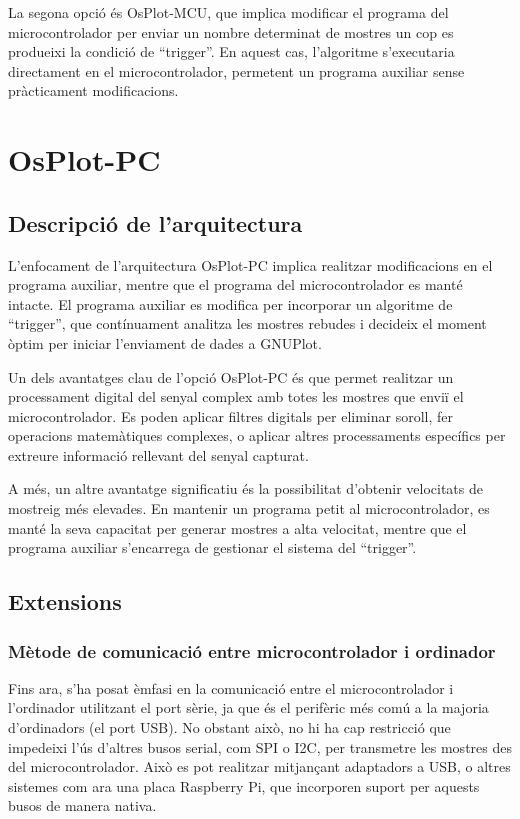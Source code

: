 \documentclass{tfgitic}[2023/06/30]
\begin{document}
La segona opció és OsPlot-MCU, que implica modificar el programa del
microcontrolador per enviar un nombre determinat de mostres un cop es
produeixi la condició de ``trigger''. En aquest cas, l'algoritme
s'executaria directament en el microcontrolador, permetent un programa
auxiliar sense pràcticament modificacions.

\newpage

\section{OsPlot-PC}

\subsection{Descripció de l'arquitectura}

L'enfocament de l'arquitectura OsPlot-PC implica realitzar
modificacions en el programa auxiliar, mentre que el programa del
microcontrolador es manté intacte. El programa auxiliar es modifica
per incorporar un algoritme de ``trigger'', que contínuament analitza
les mostres rebudes i decideix el moment òptim per iniciar l'enviament
de dades a GNUPlot.

Un dels avantatges clau de l'opció OsPlot-PC és que permet realitzar
un processament digital del
senyal complex amb totes les mostres que enviï el microcontrolador. Es
poden aplicar filtres digitals per eliminar soroll, fer operacions
matemàtiques complexes, o aplicar altres processaments específics per
extreure informació rellevant del senyal capturat.

A més, un altre avantatge significatiu és la possibilitat d'obtenir
velocitats de mostreig més elevades. En mantenir un programa petit al
microcontrolador, es manté la seva capacitat per generar mostres a
alta velocitat, mentre que el programa auxiliar s'encarrega de
gestionar el sistema del ``trigger''.

\subsection{Extensions}
\label{subsec:extensions-osplot-pc}

\subsubsection{Mètode de comunicació entre microcontrolador i ordinador}

Fins ara, s'ha posat èmfasi en la comunicació entre el
microcontrolador i l'ordinador utilitzant el port sèrie, ja que és el
perifèric més comú a la majoria d'ordinadors (el port USB). No obstant
això, no hi ha cap restricció que impedeixi l'ús d'altres busos
serial, com SPI o I2C, per transmetre les mostres des del
microcontrolador. Això es pot realitzar mitjançant adaptadors a USB, o
altres sistemes com ara una placa Raspberry Pi, que incorporen suport
per aquests busos de manera nativa.
\end{document}
